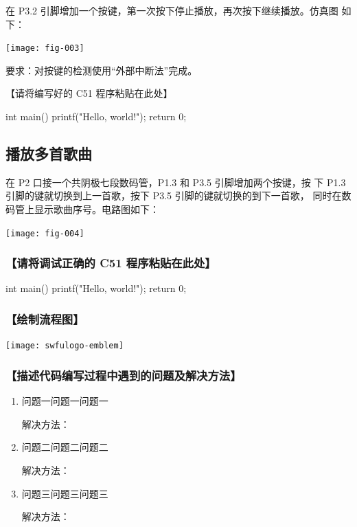 \documentclass{swfulabreport}
\begin{document}
在 P3.2 引脚增加一个按键，第一次按下停止播放，再次按下继续播放。仿真图
如下：

\begin{center}
  \texttt{[image: fig-003]}
\end{center}

要求：对按键的检测使用“外部中断法”完成。

【请将编写好的 C51 程序粘贴在此处】

\begin{ccode}
int main(){
  printf("Hello, world!\n");
  return 0;
}
\end{ccode}

\subsection{播放多首歌曲}

在 P2 口接一个共阴极七段数码管，P1.3 和 P3.5 引脚增加两个按键，按
下 P1.3 引脚的键就切换到上一首歌，按下 P3.5 引脚的键就切换的到下一首歌，
同时在数码管上显示歌曲序号。电路图如下：

\begin{center}
  \texttt{[image: fig-004]}
\end{center}


\subsubsection{【请将调试正确的 C51 程序粘贴在此处】}

\begin{ccode}
int main(){
  printf("Hello, world!\n");
  return 0;
}
\end{ccode}

\subsubsection{【绘制流程图】}

\begin{center}
  \texttt{[image: swfulogo-emblem]}
\end{center}


\subsubsection{【描述代码编写过程中遇到的问题及解决方法】}

\begin{enumerate}
\item 问题一问题一问题一

  解决方法：\zhlipsum[1]

\item 问题二问题二问题二

  解决方法：\zhlipsum[2]

\item 问题三问题三问题三
  
  解决方法：\zhlipsum[3]

\end{enumerate}
\end{document}
